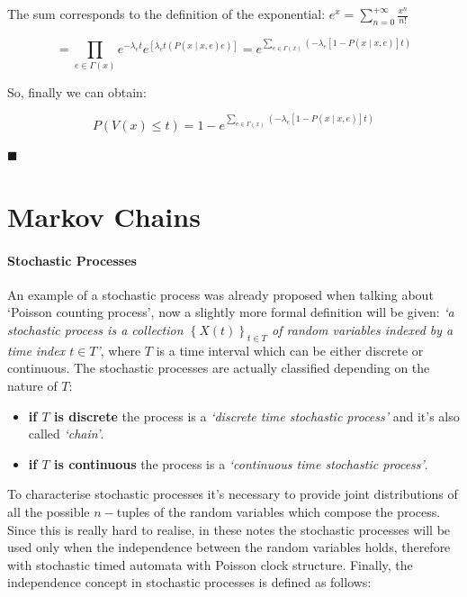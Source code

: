 \documentclass[12pt,a4paper]{article}
\begin{document}
\medskip
\noindent
The sum corresponds to the definition of the exponential: $e^x=\sum_{n=0}^{+\infty}{\frac{x^n}{n!}}$

\begin{Large}
$$
=\prod_{e\in\Gamma(x)}{e^{-\lambda_e t}
e^{\left[\lambda_e t\left(P\left(x \mid x,e\right)e\right)\right]}
}
=e^{\sum_{e\in\Gamma(x)}{\left(-\lambda_e
\left[
1-P\left(x \mid x,e\right)
\right]t\right)
}}
$$
\end{Large}

\medskip\noindent
So, finally we can obtain:
\begin{Large}
$$
P\left(V(x)\leq t\right)=1-
e^{\sum_{e\in\Gamma(x)}{\left(-\lambda_e
\left[
1-P\left(x \mid x,e\right)
\right]t\right)
}}
$$
\end{Large}
\begin{flushright}
$\blacksquare$
\end{flushright}
\newpage
\section{Markov Chains}
\paragraph{Stochastic Processes}
An example of a stochastic process was already proposed when talking about `Poisson counting process', now a slightly more formal definition will be given: \emph{`a stochastic process is a collection $\left\lbrace X\left(t\right) \right\rbrace_{t\in T} $
of random variables indexed by a time index $t\in T$'}, where $T$ is a time interval which can be either discrete or continuous.
The stochastic processes are actually classified depending on the nature of $T$:
\begin{itemize}
\item \textbf{if $T$ is discrete} the process is a \emph{`discrete time stochastic process'} 
and it's also called \emph{`chain'}.
\item \textbf{if $T$ is continuous} the process is a \emph{`continuous time stochastic process'}.
\end{itemize}
To characterise stochastic processes it's necessary to provide joint distributions of all the possible $n-$tuples of the random variables which compose the process. Since this is really hard to realise, in these notes the stochastic processes will be used
only when the independence between the random variables holds, therefore with stochastic timed automata with Poisson clock structure. Finally, the independence concept in stochastic processes is defined as follows:
\end{document}
